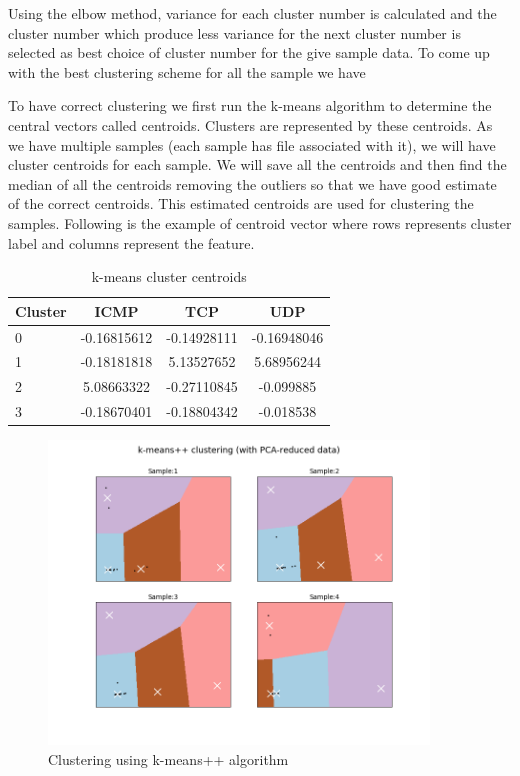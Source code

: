 \documentclass[10pt,oneside,a4paper]{article}
\begin{document}
Using the elbow method, variance for each cluster number is calculated and the cluster number which produce less variance for the next cluster number is selected as best choice of cluster number for the give sample data. To come up with the best clustering scheme for all the sample we have

To have correct clustering we first run the k-means algorithm to determine the central vectors called centroids. Clusters are represented by these centroids. As we have multiple samples (each sample has file associated with it), we will have cluster centroids for each sample. We will save all the centroids and then find the median of all the centroids removing the outliers so that we have good estimate of the correct centroids. This estimated centroids are used for clustering the samples. Following is the example of centroid vector where rows represents cluster label and columns represent the feature.

\begin{table}[H]
\centering
  \begin{tabular}{ l | c  c  c }
    Cluster      & ICMP  & TCP  & UDP \\
    \hline
    0         &{-0.16815612}       &{-0.14928111}    &{-0.16948046} \\
    1         &{-0.18181818}       &{5.13527652}     &{5.68956244} \\
    2         &{5.08663322}        &{-0.27110845}    &{-0.099885} \\
    3         &{-0.18670401}       &{-0.18804342}    &{-0.018538} \\
  \end{tabular}
\caption{k-means cluster centroids} \label{table:centroids}
\end{table}

\begin{figure}[H]
\centering
\includegraphics[width=0.90\textwidth]{kemans-clustering}
\caption{Clustering using k-means++ algorithm} \label{fig:kmeans-clustering}
\end{figure}
\end{document}

